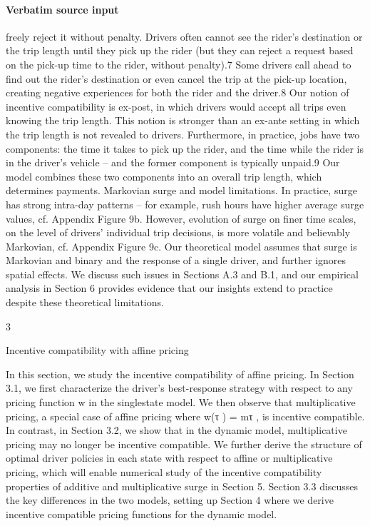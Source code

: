 \documentclass[10pt]{article}
\begin{document}
\paragraph{Verbatim source input}
\begin{ReviewVerbatim}
freely reject it without penalty. Drivers often cannot see the rider’s destination or the trip length
until they pick up the rider (but they can reject a request based on the pick-up time to the rider,
without penalty).7 Some drivers call ahead to find out the rider’s destination or even cancel the
trip at the pick-up location, creating negative experiences for both the rider and the driver.8 Our
notion of incentive compatibility is ex-post, in which drivers would accept all trips even knowing
the trip length. This notion is stronger than an ex-ante setting in which the trip length is not
revealed to drivers. Furthermore, in practice, jobs have two components: the time it takes to pick
up the rider, and the time while the rider is in the driver’s vehicle – and the former component is
typically unpaid.9 Our model combines these two components into an overall trip length, which
determines payments.
Markovian surge and model limitations. In practice, surge has strong intra-day patterns
– for example, rush hours have higher average surge values, cf. Appendix Figure 9b. However,
evolution of surge on finer time scales, on the level of drivers’ individual trip decisions, is more
volatile and believably Markovian, cf. Appendix Figure 9c. Our theoretical model assumes that
surge is Markovian and binary and the response of a single driver, and further ignores spatial effects.
We discuss such issues in Sections A.3 and B.1, and our empirical analysis in Section 6 provides
evidence that our insights extend to practice despite these theoretical limitations.

3

Incentive compatibility with affine pricing

In this section, we study the incentive compatibility of affine pricing. In Section 3.1, we first
characterize the driver’s best-response strategy with respect to any pricing function w in the singlestate model. We then observe that multiplicative pricing, a special case of affine pricing where
w(τ ) = mτ , is incentive compatible. In contrast, in Section 3.2, we show that in the dynamic model,
multiplicative pricing may no longer be incentive compatible. We further derive the structure of
optimal driver policies in each state with respect to affine or multiplicative pricing, which will
enable numerical study of the incentive compatibility properties of additive and multiplicative
surge in Section 5. Section 3.3 discusses the key differences in the two models, setting up Section 4
where we derive incentive compatible pricing functions for the dynamic model.


\end{ReviewVerbatim}
\end{document}
